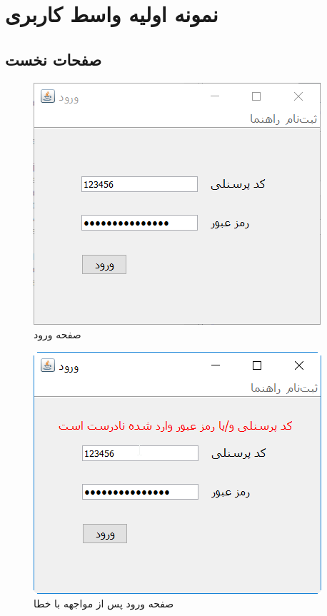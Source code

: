 \chapter{نمونه اولیه واسط کاربری}

\section{صفحات نخست}
\begin{figure}[H]
	\centering
	\includegraphics[scale=0.8]{img/prot/LoginForm}
	\caption{صفحه ورود}
\end{figure}
\begin{figure}[H]
	\centering
	\includegraphics[scale=0.8]{img/prot/LoginFormError}
	\caption{صفحه ورود پس از مواجهه با خطا}
\end{figure}
